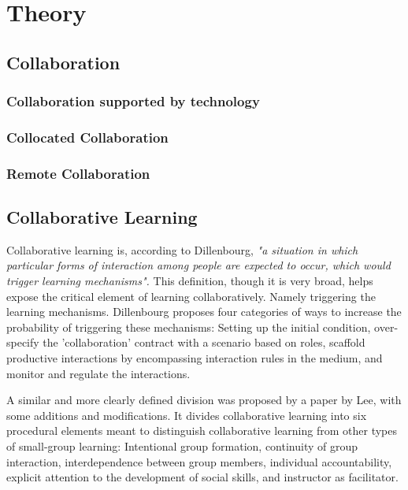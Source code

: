 \chapter{Theory}

    \section{Collaboration}
    
        \subsection{Collaboration supported by technology}
    
        \subsection{Collocated Collaboration}
        
        \subsection{Remote Collaboration}
    
    \section{Collaborative Learning}
        Collaborative learning is, according to Dillenbourg, \emph{"a situation in which particular forms of interaction among people are expected to occur, which would trigger learning mechanisms".} \cite{dillenbourg1999} This definition, though it is very broad, helps expose the critical element of learning collaboratively. Namely triggering the learning mechanisms. Dillenbourg proposes four categories of ways to increase the probability of triggering these mechanisms: Setting up the initial condition, over-specify the 'collaboration' contract with a scenario based on roles, scaffold productive interactions by encompassing interaction rules in the medium, and monitor and regulate the interactions.
        
        A similar and more clearly defined division was proposed by a paper by Lee, with some additions and modifications. It divides collaborative learning into six procedural elements meant to distinguish collaborative learning from other types of small-group learning: Intentional group formation, continuity of group interaction, interdependence between group members, individual accountability, explicit attention to the development of social skills, and instructor as facilitator. \cite{Lee2009}
        
